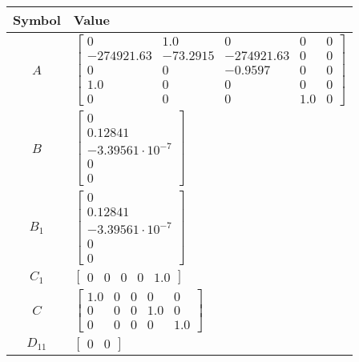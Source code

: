 \begin{tabular}{cl}
\hline
  Symbol  & Value                                                                                                                                                                       \\
\hline
   $A$    & $\left[\begin{matrix}0 & 1.0 & 0 & 0 & 0\\-274921.63 & -73.2915 & -274921.63 & 0 & 0\\0 & 0 & -0.9597 & 0 & 0\\1.0 & 0 & 0 & 0 & 0\\0 & 0 & 0 & 1.0 & 0\end{matrix}\right]$ \\
   $B$    & $\left[\begin{matrix}0\\0.12841\\-3.39561 \cdot 10^{-7}\\0\\0\end{matrix}\right]$                                                                                           \\
 $B_{1}$  & $\left[\begin{matrix}0\\0.12841\\-3.39561 \cdot 10^{-7}\\0\\0\end{matrix}\right]$                                                                                           \\
 $C_{1}$  & $\left[\begin{matrix}0 & 0 & 0 & 0 & 1.0\end{matrix}\right]$                                                                                                                \\
   $C$    & $\left[\begin{matrix}1.0 & 0 & 0 & 0 & 0\\0 & 0 & 0 & 1.0 & 0\\0 & 0 & 0 & 0 & 1.0\end{matrix}\right]$                                                                      \\
 $D_{11}$ & $\left[\begin{matrix}0 & 0\end{matrix}\right]$                                                                                                                              \\

\end{tabular}
